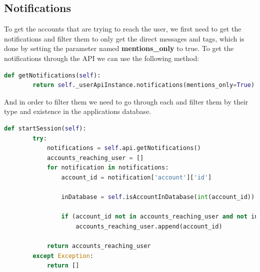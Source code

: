 \subsection{Notifications}\label{ss:notif}
To get the accounts that are trying to reach the user, we first need to get the notifications and filter them to only get the direct messages and tags, which is done
by setting the parameter named \textbf{mentions\_only} to true.
To get the notifications through the API we can use the following method:
\\[5pt]
\begin{lstlisting}[language=python, caption={Getting the notifications by API}, captionpos=b]
	def getNotifications(self):
		return self._userApiInstance.notifications(mentions_only=True)
\end{lstlisting}
And in order to filter them we need to go through each and filter them by their type and existence in the applications database.
\\[5pt]
\begin{lstlisting}[language=python, caption={Filtering the notifications}, captionpos=b]
	def startSession(self):
		try:
			notifications = self.api.getNotifications()
			accounts_reaching_user = []
			for notification in notifications:
				account_id = notification['account']['id']
				
				inDatabase = self.isAccountInDatabase(int(account_id))
		
				if (account_id not in accounts_reaching_user and not inDatabase):
					accounts_reaching_user.append(account_id)
	
			return accounts_reaching_user
		except Exception:
			return []
\end{lstlisting}
